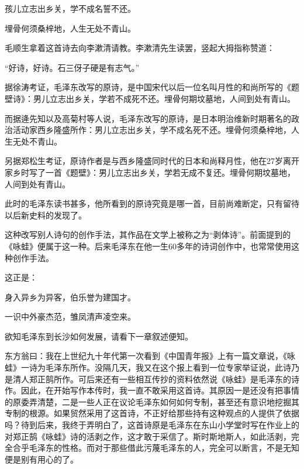 \documentclass[../../dazhuan.tex]{subfiles}
\begin{document}
\begin{emph}
\centering 孩儿立志出乡关，学不成名誓不还。
		
		埋骨何须桑梓地，人生无处不青山。\par
\end{emph}

毛顺生拿着这首诗去向李漱清请教。李漱清先生读罢，竖起大拇指称赞道：

“好诗，好诗。石三伢子硬是有志气。”

据徐涛考证，毛泽东改写的原诗，是中国宋代以后一位名叫月性的和尚所写的《题壁诗》：男儿立志出乡关，学若不成死不还。埋骨何期坟墓地，人间到处有青山。

而据逄先知以及高菊村等人说，毛泽东改写的原诗，是日本明治维新时期著名的政治活动家西乡隆盛所作：男儿立志出乡关，学不成名死不还。埋骨何须桑梓地，人生无处不青山。

另据郑松生考证，原诗作者是与西乡隆盛同时代的日本和尚释月性，他在27岁离开家乡时写了一首《题壁》：男儿立志出乡关，学若无成不复还。埋骨何期坟墓地，人间到处有青山。

此时的毛泽东读书甚多，他所看到的原诗究竟是哪一首，目前尚难断定，只有留待以后新史料的发现了。

这种改写别人诗句的创作手法，其作品在文学上被称之为“剥体诗”。前面提到的《咏蛙》便属于这一种。后来毛泽东在他一生60多年的诗词创作中，也常常使用这种创作手法。

这正是：\begin{xemph}身入异乡为异客，伯乐誉为建国才。

\hspace{4em}一识中外豪杰范，雏凤清声凌空来。\end{xemph}

欲知毛泽东到长沙如何发展，请看下一章叙述便知。

东方翁曰：我在上世纪九十年代第一次看到《中国青年报》上有一篇文章说，《咏蛙》一诗为毛泽东所作。没隔几天，我又在这个报上看到一位专家举证说，此诗乃是清人郑正鹄所作。可后来还有一些相互传抄的资料依然说《咏蛙》是毛泽东的诗作。因此，在开始写作本传时，我一直不敢采用这首诗。其原因一是还没有把事情的原委弄清楚，二是一些人正在议论毛泽东如何如何专制，甚至还有意识地挖掘其专制的根源。如果贸然采用了这首诗，不正好给那些持有这种观点的人提供了依据吗？待到后来，我终于弄明白了，这首诗原是毛泽东在东山小学堂时写在作业上的对郑正鹄《咏蛙》诗的活剥之作，这才敢于采信了。斯时斯地斯人，如此活剥，完全合乎毛泽东的性格。而对于那些借此污蔑毛泽东的人，完全可以断言，不是无知便是别有用心的了。
\end{document}
